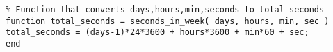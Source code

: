 \begin{verbatim}
% Function that converts days,hours,min,seconds to total seconds
function total_seconds = seconds_in_week( days, hours, min, sec )
total_seconds = (days-1)*24*3600 + hours*3600 + min*60 + sec;
end
\end{verbatim}

